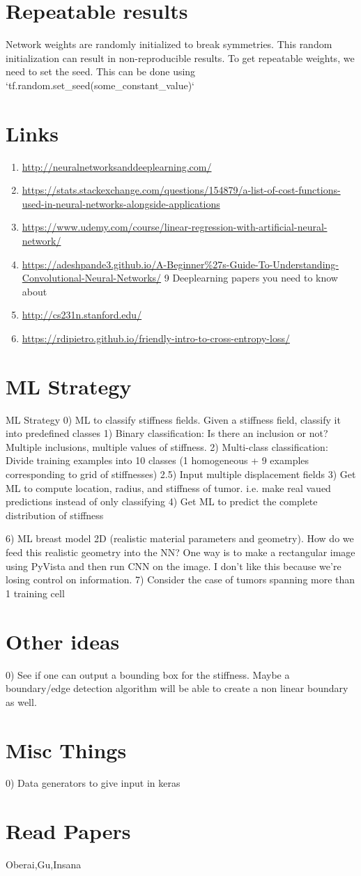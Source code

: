 \documentclass{article}
\begin{document}
\section{Repeatable results}
Network weights are randomly initialized to break symmetries. This random initialization can result in non-reproducible results. To get repeatable weights, we need to set the seed. This can be done using `tf.random.set\_seed(some\_constant\_value)`
\section{Links}
\begin{enumerate}
\item{\url{http://neuralnetworksanddeeplearning.com/}}
\item{\url{https://stats.stackexchange.com/questions/154879/a-list-of-cost-functions-used-in-neural-networks-alongside-applications}}
\item{\url{https://www.udemy.com/course/linear-regression-with-artificial-neural-network/}}
\item{\url{https://adeshpande3.github.io/A-Beginner%27s-Guide-To-Understanding-Convolutional-Neural-Networks/} 9 Deeplearning  papers you need to know about}
\item{\url{http://cs231n.stanford.edu/} }
\item{\url{https://rdipietro.github.io/friendly-intro-to-cross-entropy-loss/}}
\end{enumerate}
\section{ML Strategy}
ML Strategy
0) ML to classify stiffness fields. Given a stiffness field, classify it into predefined classes
1) Binary classification: Is there an inclusion or not? Multiple inclusions, multiple values of stiffness. 
2) Multi-class classification: Divide training examples into 10 classes (1 homogeneous + 9 examples corresponding to grid of stiffnesses)
2.5) Input multiple displacement fields
3) Get ML to compute location, radius, and stiffness of tumor. i.e. make real vaued predictions instead of only classifying
4) Get ML to predict the complete distribution of stiffness

6) ML breast model 2D (realistic material parameters and geometry). How do we feed this realistic geometry into the NN? One way is to make a rectangular image using PyVista and then run CNN on the image. I don't like this because we're losing control on information.  
7) Consider the case of tumors spanning more than 1 training cell
\section{Other ideas}
0) See if one can output a bounding box for the stiffness. Maybe a boundary/edge detection algorithm will be able to create a non linear boundary as well.
\section{Misc Things}
0) Data generators to give input in keras
\section{Read Papers}
\item{Oberai,Gu,Insana}
\end{document}

